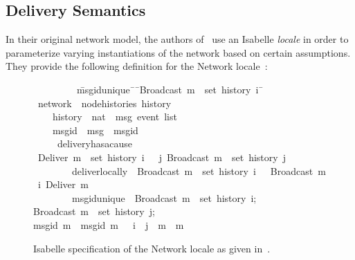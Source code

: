 \subsection{Delivery Semantics}
In their original network model, the authors of~\citep{gomes17} use an Isabelle
\textit{locale} in order to parameterize varying instantiations of the network
based on certain assumptions. They provide the following definition for the
Network locale~\citep{gomes17}:
\begin{figure}[H]
\begin{isabelle}
~~~~~~~~\ \=msg{\isacharunderscore}id{\isacharunderscore}unique{\isacharcolon}\ \={\isasymrbrakk}\ \={\isachardoublequoteopen}Broadcast\ m\ {\isasymin}\ set\ {\isacharparenleft}history\ i{\isacharparenright}\ \=\kill
{}\ network\ {\isacharequal}\ node{\isacharunderscore}histories\ history\\
~~~~\>history\ {\isacharcolon}{\isacharcolon}\ {\isachardoublequoteopen}nat\ {\isasymRightarrow}\ {\isacharprime}msg\ event\ list{\isachardoublequoteclose}\ {\isacharplus}\\
~~~~\>msg{\isacharunderscore}id\ {\isacharcolon}{\isacharcolon}\ {\isachardoublequoteopen}{\isacharprime}msg\ {\isasymRightarrow}\ {\isacharprime}msgid{\isachardoublequoteclose}\\
~~~~\ delivery{\isacharunderscore}has{\isacharunderscore}a{\isacharunderscore}cause{\isacharcolon}\\
\>\>{\isasymlbrakk}\ {\isachardoublequoteopen}Deliver\ m\ {\isasymin}\ set\ {\isacharparenleft}history\ i{\isacharparenright}\ \>\>{\isasymrbrakk}\ {\isasymLongrightarrow}\ {\isasymexists}j{\isachardot}\ Broadcast\ m\ {\isasymin}\ set\ {\isacharparenleft}history\ j{\isacharparenright}{\isachardoublequoteclose}\\
~~~~~~~~\>deliver{\isacharunderscore}locally{\isacharcolon}\ \>{\isasymlbrakk}\ \>{\isachardoublequoteopen}Broadcast\ m\ {\isasymin}\ set\ {\isacharparenleft}history\ i{\isacharparenright}\ \>{\isasymrbrakk}\ {\isasymLongrightarrow}\  Broadcast\ m\ {\isasymsqsubset}\isactrlsup i\ Deliver\ m{\isachardoublequoteclose}\\
~~~~~~~~\>msg{\isacharunderscore}id{\isacharunderscore}unique{\isacharcolon}\ \>{\isasymlbrakk}\ \>{\isachardoublequoteopen}Broadcast\ m{}\ {\isasymin}\ set\ {\isacharparenleft}history\ i{\isacharparenright};\\
\>\>\>Broadcast\ m{}\ {\isasymin}\ set\ {\isacharparenleft}history\ j{\isacharparenright};\\
\>\>\>msg{\isacharunderscore}id\ m{}\ {\isacharequal}\ msg{\isacharunderscore}id\ m{}\ \>{\isasymrbrakk}\ {\isasymLongrightarrow}\ i\ {\isacharequal}\ j\ {\isasymand}\ m{}\ {\isacharequal}\ m{}{\isachardoublequoteclose}
\end{isabelle}
\centering
\caption{Isabelle specification of the Network locale as given
  in~\citep{gomes17}.}
\end{figure}

